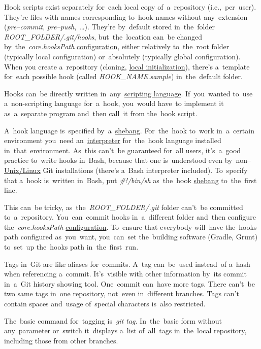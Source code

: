 Hook scripts exist separately for~each local copy of~a~repository (i.e.,~per~user). They're files with names corresponding to~hook names without any~extension (\textit{pre--commit}, \textit{pre--push},~\dots). They're by~default stored in~the~folder \textit{ROOT\_FOLDER/.git/hooks}, but~the~location can~be changed by~the~\textit{core.hooksPath} \hyperref[gitconfig]{configuration}, either relatively to~the~root folder (typically local configuration) or~absolutely (typically global configuration). When you create a~repository (cloning, \hyperref[initrepo]{local initialization}), there's a~template for~each possible hook (called \textit{HOOK\_NAME.sample}) in~the~default folder.

Hooks can~be directly written in~any~\hyperref[scriptinglanguages]{scripting language}. If~you~wanted to~use a~non-scripting language for~a~hook, you~would have~to implement it as~a~separate program and~then call~it from the~hook script.

A~hook language is~specified by~a~\hyperref[scriptinglanguages]{shebang}. For~the~hook to~work in~a~certain environment you~need an~\hyperref[compiledinterpretedlanguages]{interpreter} for~the~hook language installed in~that~environment. As~this can't~be guaranteed for~all users, it's~a~good practice to~write hooks in~Bash, because that one is~understood even  by~non--\hyperref[unixlinux]{Unix/Linux} Git installations (there's a~Bash interpreter included). To~specify that a~hook is~written in~Bash, put \textit{\#!/bin/sh} as~the~hook \hyperref[scriptinglanguages]{shebang} to~the~first line.

This can~be tricky, as~the~\textit{ROOT\_FOLDER/.git} folder can't~be committed to~a~repository. You~can~commit hooks in~a~different folder and~then configure the~\textit{core.hooksPath} \hyperref[gitconfig]{configuration}. To~ensure that everybody will~have the~hooks path configured as~you~want, you~can~set the~building software (Gradle, Grunt) to~set~up the~hooks path in~the~first~run.

Tags in~Git are like aliases for~commits. A~tag can~be~used instead~of a~hash when referencing a~commit. It's~visible with other information by~its commit in~a~Git history showing tool. One~commit can~have more tags. There can't~be two same tags in~one repository, not~even in~different branches. Tags can't contain spaces and~usage of~special characters is~also restricted.

The~basic command for~tagging is~\textit{git tag}. In~the~basic form without any~parameter or~switch it~displays a~list of~all~tags in~the~local repository, including those from other branches.

